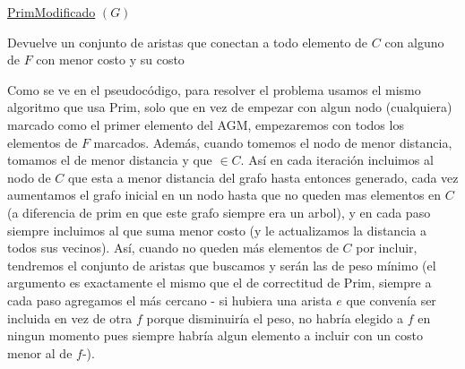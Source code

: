 \documentclass[A4paper,oneside,fleqn,11pt]{article}
\theoremstyle{definition}
\newcommand{\NN}{\mathbb{N}}
\begin{document}
\begin{algorithm}[H]

    \underline{PrimModificado} $(G)$\;
    \Output{$costo \in \NN_{0}$, $lista$ vector de aristas}
       
       	\caption{Devuelve un conjunto de aristas que conectan a todo elemento de $C$ con alguno de $F$ con menor costo y su costo} 
\end{algorithm}


Como se ve en el pseudocódigo, para resolver el problema usamos el mismo algoritmo que usa Prim, solo que en vez de empezar con algun nodo (cualquiera) marcado como el primer elemento del AGM, empezaremos con todos los elementos de $F$ marcados. Además, cuando tomemos el nodo de menor distancia, tomamos el de menor distancia y que $\in C$. Así en cada iteración incluimos al nodo de $C$ que esta a menor distancia del grafo hasta entonces generado, cada vez aumentamos el grafo inicial en un nodo hasta que no queden mas elementos en $C$ (a diferencia de prim en que este grafo siempre era un arbol), y en cada paso siempre incluimos al que suma menor costo (y le actualizamos la distancia a todos sus vecinos). Así, cuando no queden más elementos de $C$ por incluir, tendremos el conjunto de aristas que buscamos y serán las de peso mínimo (el argumento es exactamente el mismo que el de correctitud de Prim, siempre a cada paso agregamos el más cercano - si hubiera una arista $e$ que convenía ser incluida en vez de otra $f$ porque disminuiría el peso, no habría elegido a $f$ en ningun momento pues siempre habría algun elemento a incluir con un costo menor al de $f$-). 
\end{document}
